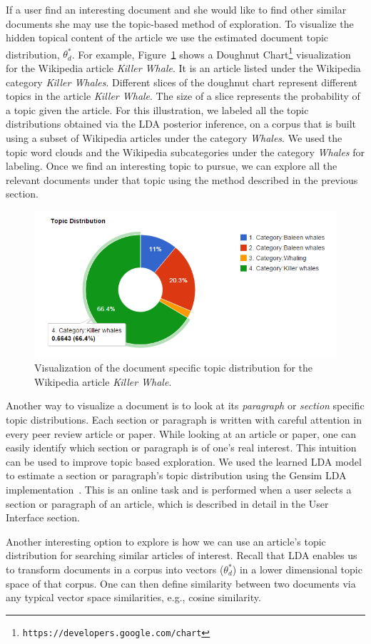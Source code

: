 If a user find an interesting document and she would like to
find other similar documents she may use the topic-based method of exploration.
To visualize the hidden topical content of the article we use the 
estimated document topic distribution, $\theta^*_{d}$.
For example, Figure~\ref{fig:doc-topic-distribution} shows a Doughnut  
Chart\footnote{\texttt{https://developers.google.com/chart}} 
visualization for the Wikipedia article \textit{Killer Whale}.
It is an article listed under the Wikipedia category          
\textit{Killer Whales}. Different slices of the doughnut chart represent
different topics in the article \textit{Killer Whale}. The size 
of a slice represents the probability of a topic given the article. 
For this illustration, we labeled all the topic 
distributions obtained via the LDA posterior inference, on a 
corpus that is built using a subset of Wikipedia articles under the 
category \textit{Whales}. We used the topic word clouds 
and the Wikipedia subcategories under the category \textit{Whales} 
for labeling. Once we find an interesting topic to pursue, we can 
explore all the relevant documents under that topic using the 
method described in the previous section. 

\begin{figure}[htb]\centering 
\includegraphics[width=.45\textwidth]{images/doc_topic_distribution.png}
\caption{Visualization of the document specific topic distribution 
for the Wikipedia article \textit{Killer Whale}.}
\label{fig:doc-topic-distribution}
\end{figure}

Another way to visualize a document is to look at its 
\textsl{paragraph} or \textsl{section} specific topic distributions. 
Each section or paragraph is written with careful attention in every 
peer review article or paper. While looking at an article or paper,  
one can easily identify which section or paragraph is of one's real 
interest. This intuition can be used to improve topic based 
exploration. We used the learned LDA model to 
estimate a section or paragraph's topic distribution using the
Gensim LDA implementation~\cite{rehurek_lrec}. This is an 
online task and is performed when a user selects a section or 
paragraph of an article, which is described in detail in the \system 
User Interface section.


Another interesting option to explore is how we can use an article's 
topic distribution for searching similar articles of interest. 
Recall that LDA enables us to transform documents in a corpus into 
vectors ($\theta^*_{d}$) in a lower dimensional topic space 
of that corpus. One can then define similarity between two documents 
via any typical vector space similarities, e.g., cosine similarity. 

